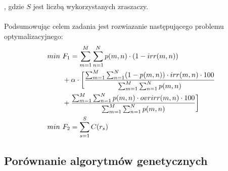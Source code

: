 \documentclass[twoside]{iisthesis}
\begin{document}
, gdzie $S$ jest liczbą wykorzystanych zraszaczy.\\\\
Podsumowując celem zadania jest rozwiazanie następującego problemu optymalizacyjnego:
\begin{equation}
	\begin{split}
		min \text{  } & 	F_{1} = \sum_{m=1}^{M}\sum_{n=1}^{N} p(m,n) \cdot (1 - irr(m,n)) \\
		&+ \alpha \cdot \bigg{[}\dfrac{\sum_{m=1}^{M}\sum_{n=1}^{N} (1 - p(m,n)) \cdot irr(m,n) \cdot 100}{\sum_{m=1}^{M}\sum_{n=1}^{N} p(m,n)} \\
		&+ \dfrac{\sum_{m=1}^{M}\sum_{n=1}^{N} p(m,n) \cdot ovrirr(m,n) \cdot 100}{\sum_{m=1}^{M}\sum_{n=1}^{N} p(m,n)}\bigg{]}\\
		min \text{  }&	F_{2} = \sum_{s=1}^{S} C(r_{s})
	\end{split}
\end{equation}

\subsection{Porównanie algorytmów genetycznych}
\end{document}
